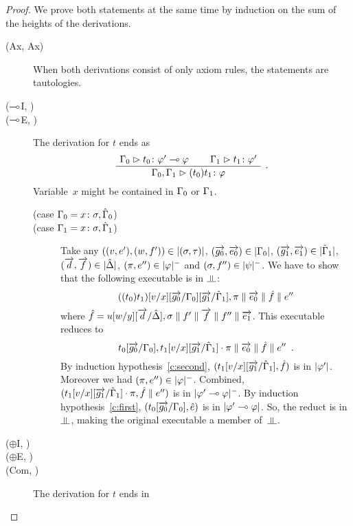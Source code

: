  \begin{proof}
 We prove both statements at the same time by induction on the sum of
 the heights of the derivations.
  \begin{description}
  \item[(Ax, Ax)] When both derivations consist of only axiom rules,
       the statements are tautologies.
   \item[($\multimap$I, \textminus)]
   \item[($\multimap$E, \textminus)]
	The derivation for $t$ ends as
	\[
	\aseq{\G_0}{\tj{t_0}{\phi'\limp\phi}}
	\aseq{\G_1}{\tj{t_1}{\phi'}}
	\bseq{\G_0,\G_1}{\tj{(t_0)t_1}{\phi}}
	\DisplayProof\enspace.
	\]
	Variable~$x$ might be contained in $\Gamma_0$ or $\Gamma_1$.
	\begin{description}
	 \item[(case $\Gamma_0 = {x} \colon{\sigma},\hat{\Gamma}_0$)] 
	 \item[(case $\Gamma_1 = {x} \colon{\sigma},\hat{\Gamma}_1$)]
	      Take any
	      $((v,e'),(w,f'))\in|{(\sigma,\tau)}|$,
	      $(\overrightarrow{g_0},\overrightarrow{e_0})\in|{\Gamma_0}|$,
	      $(\overrightarrow{g_1},\overrightarrow{e_1})\in|{\hat{\Gamma}_1}|$,
	      $(\overrightarrow{d},\overrightarrow{f})\in|{\hat{\Delta}}|$,
	      $(\pi,e'')\in|{\varphi}|^-$ and
	      $(\sigma,f'')\in|{\psi}|^-$.
	      We have to show that the following executable is in $\bbot$:
	      \[
	       ((t_0)t_1)[v/x][\overrightarrow{g_0}/\Gamma_0][\overrightarrow{g_1}/\hat{\Gamma}_1],\pi\parallel
	      \overrightarrow{e_0}
	      \parallel\hat{f}\parallel
	      e''
	      \]
	      where
	      $\hat f = u[w/y][\overrightarrow{d}/\hat{\Delta}],\sigma\parallel f'\parallel
	      \overrightarrow{f}\parallel f''\parallel \overrightarrow{e_1}$.  This executable reduces
	      to
	      \[
	       t_0[\overrightarrow{g_0}/\Gamma_0],t_1[v/x][\overrightarrow{g_1}/\hat{\Gamma}_1]\cdot \pi\parallel
	      \overrightarrow{e_0}
	      \parallel\hat{f}\parallel
	      e''\enspace.
	      \]
	      By induction hypothesis~\ref{c:second},
	      $(t_1[v/x][\overrightarrow{g_1}/\hat{\Gamma}_1],\hat f)$ is in
	      $|{\varphi'}|$.
	      Moreover we had $(\pi,e'')\in|{\varphi}|^-$.
	      Combined,
	      $(t_1[v/x][\overrightarrow{g_1}/\hat{\Gamma}_1]\cdot\pi,\hat f\parallel e'')$
	      is in $|{\varphi'\multimap\varphi}|^-$\kern -1pt.
	      By induction hypothesis~\ref{c:first},
	      $(t_0[\overrightarrow{g_0}/\Gamma_0],\hat e)$ is in
	      $|{\varphi'\multimap\varphi}|$.
	      So, the reduct is in $\bbot$, making the original
	      executable a member of~$\bbot$.
	\end{description}
   \item[($\oplus$I, \textminus)]
   \item[($\oplus$E, \textminus)]
   \item[(Com, \textminus)]
       The derivation for $t$ ends in

\end{description}
\end{proof}
